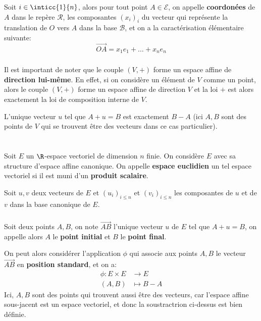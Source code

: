 Soit \(i\in\inticc{1}{n}\), alors pour tout point \(A \in \mathscr{E}\), on appelle \textbf{coordonées} de \(A\) dans le repère \(\mathscr{R}\), les composantes \((x_i)_i\) du vecteur qui représente la translation de \(O\) vers \(A\) dans la base \(\mathscr{B}\), et on a la caractérisation élémentaire suivante:
\[
   \overrightarrow{OA} = x_1e_1 + \ldots + x_ne_n 
\]

\subsection*{}
Il est important de noter que le couple \((V, +)\) forme un espace affine de \textbf{direction lui-même}. En effet, si on considère un élément de \(V\) comme un point, alors le couple  \((V, +)\) forme un espace affine de direction \(V\) et la loi \(+\) est alors exactement la loi de composition interne de \(V\).\<

L'unique vecteur \(u\) tel que \(A + u = B\) est exactement \(B - A\) (ici \(A, B\) sont des points de \(V\) qui se trouvent être des vecteurs dans ce cas particulier). \<\<

\chapter*{} %

Soit \(E\) un \(\R\)-espace vectoriel de dimension \(n\) finie. On considère \(E\) avec sa structure d'espace affine canonique.
On appelle \textbf{espace euclidien} un tel espace vectoriel si il est muni d'un \textbf{produit scalaire}.\<

Soit \(u, v\) deux vecteurs de \(E\) et \((u_i)_{i \leq n}\) et \((v_i)_{i \leq n}\) les composantes de \(u\) et de \(v\) dans la base canonique de \(E\).

\subsection*{}
Soit deux points \(A, B\), on note \(\overrightarrow{AB}\) l'unique vecteur \(u\) de \(E\) tel que \(A + u = B\), on appelle alors \(A\) le \textbf{point initial} et \(B\) le \textbf{point final}. \<

On peut alors considérer l'application \(\phi\) qui associe aux points \(A, B\) le vecteur \(\overrightarrow{AB}\) en \textbf{position standard}, et on a:
\[
   \begin{aligned}
      \phi: E \times E &\longrightarrow E\\
      (A, B) &\longmapsto B - A
   \end{aligned}
\]
Ici, \(A, B\) sont des points qui trouvent aussi être des vecteurs, car l'espace affine sous-jacent est un espace vectoriel, et donc la soustractrion ci-dessus est bien définie.

